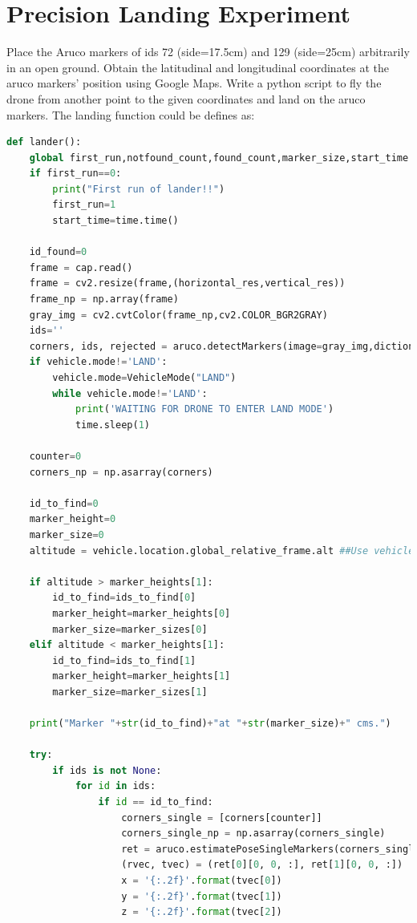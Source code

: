 \documentclass{article}
\begin{document}
\section{Precision Landing Experiment}
Place the Aruco markers of ids 72 (side=17.5cm) and 129 (side=25cm) arbitrarily in an open ground. Obtain the latitudinal and longitudinal coordinates at the aruco markers' position using Google Maps. Write a python script to fly the drone from another point to the given coordinates and land on the aruco markers. The landing function could be defines as:
\begin{lstlisting}[language=Python]
def lander():
    global first_run,notfound_count,found_count,marker_size,start_time
    if first_run==0:
        print("First run of lander!!")
        first_run=1
        start_time=time.time()

    id_found=0
    frame = cap.read()
    frame = cv2.resize(frame,(horizontal_res,vertical_res))
    frame_np = np.array(frame)
    gray_img = cv2.cvtColor(frame_np,cv2.COLOR_BGR2GRAY)
    ids=''
    corners, ids, rejected = aruco.detectMarkers(image=gray_img,dictionary=aruco_dict,parameters=parameters)
    if vehicle.mode!='LAND':
        vehicle.mode=VehicleMode("LAND")
        while vehicle.mode!='LAND':
            print('WAITING FOR DRONE TO ENTER LAND MODE')
            time.sleep(1)

    counter=0
    corners_np = np.asarray(corners)

    id_to_find=0
    marker_height=0
    marker_size=0
    altitude = vehicle.location.global_relative_frame.alt ##Use vehicle.rangefinder.distance if rangefinder data desired instead

    if altitude > marker_heights[1]:
        id_to_find=ids_to_find[0]
        marker_height=marker_heights[0]
        marker_size=marker_sizes[0]
    elif altitude < marker_heights[1]:
        id_to_find=ids_to_find[1]
        marker_height=marker_heights[1]
        marker_size=marker_sizes[1]

    print("Marker "+str(id_to_find)+"at "+str(marker_size)+" cms.")

    try:
        if ids is not None:
            for id in ids:
                if id == id_to_find:
                    corners_single = [corners[counter]]
                    corners_single_np = np.asarray(corners_single)
                    ret = aruco.estimatePoseSingleMarkers(corners_single,marker_size,cameraMatrix=cameraMatrix,distCoeffs=cameraDistortion)
                    (rvec, tvec) = (ret[0][0, 0, :], ret[1][0, 0, :])
                    x = '{:.2f}'.format(tvec[0])
                    y = '{:.2f}'.format(tvec[1])
                    z = '{:.2f}'.format(tvec[2])


\end{lstlisting}
\end{document}
